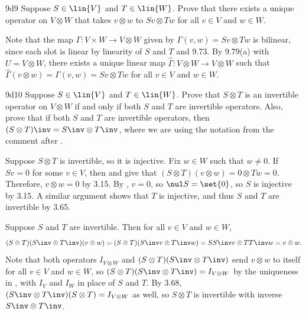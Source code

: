 \begin{exercise}{9d9}
    Suppose $S \in \lin{V}$ and $T \in \lin{W}$.
    Prove that there exists a unique operator on $V \otimes W$ that takes $v \otimes w$ to $Sv \otimes Tw$ for all $v \in V$ and $w \in W$.

\end{exercise}

\begin{sol}
    Note that the map $\Gamma \colon V \times W \to V \otimes W$ given by $\Gamma(v, w) = Sv \otimes Tw$ is bilinear, since each slot is linear by linearity of $S$ and $T$ and 9.73.
    By 9.79(a) with $U = V \otimes W$, there exists a unique linear map $\hat \Gamma \colon V \otimes W \to V \otimes W$ such that $\hat \Gamma(v \otimes w) = \Gamma(v, w) = Sv \otimes Tw$ for all $v \in V$ and $w \in W$.
\end{sol}

\begin{exercise}{9d10}
    Suppose $S \in \lin{V}$ and $T \in \lin{W}$.
    Prove that $S \otimes T$ is an invertible operator on $V \otimes W$ if and only if both $S$ and $T$ are invertible operators.
    Also, prove that if both $S$ and $T$ are invertible operators, then $(S \otimes T)\inv = S\inv \otimes T\inv$, where we are using the notation from the comment after .
\end{exercise}

\begin{soliff}
    \rightimp Suppose $S \otimes T$ is invertible, so it is injective.
    Fix $w \in W$ such that $w \neq 0$.
    If $S v = 0$ for some $v \in V$, then  and  give that $(S \otimes T)(v \otimes w) = 0 \otimes Tw = 0$.
    Therefore, $v \otimes w = 0$ by 3.15.
    By , $v = 0$, so $\nul S = \set{0}$, so $S$ is injective by 3.15.
    A similar argument shows that $T$ is injective, and thus $S$ and $T$ are invertible by 3.65.

    \leftimp Suppose $S$ and $T$ are invertible.
    Then for all $v \in V$ and $w \in W$,
    \[
        (S \otimes T)(S\inv \otimes T\inv)(v \otimes w) = (S \otimes T)(S\inv v \otimes T\inv w) = SS\inv v \otimes TT\inv w = v \otimes w.
    \]
    Note that both operators $I_{V \otimes W}$ and $(S \otimes T)(S\inv \otimes T\inv)$ send $v \otimes w$ to itself for all $v \in V$ and $w \in W$, so $(S \otimes T)(S\inv \otimes T\inv) = I_{V \otimes W}$ by the uniqueness in , with $I_V$ and $I_W$ in place of $S$ and $T$.
    By 3.68, $(S\inv \otimes T\inv)(S \otimes T) = I_{V \otimes W}$ as well, so $S \otimes T$ is invertible with inverse $S\inv \otimes T\inv$.
\end{soliff}

